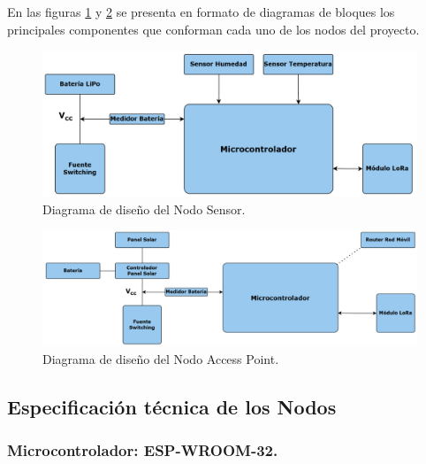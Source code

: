 En las figuras \ref{fig:DisNodoSensor} y \ref{fig:DisNodoAP} se presenta en formato de diagramas de bloques los principales componentes que conforman cada uno de los nodos del proyecto.



\begin{figure}[H]
    \centering
    \includegraphics[width=1\linewidth]{Figures/Hardware/Modulos/nodo_sensor.png}
    \caption{ Diagrama de diseño del Nodo Sensor.}
    \label{fig:DisNodoSensor}
\end{figure}

\begin{figure}[H]
    \centering
    \includegraphics[width=1\linewidth]{Figures/Hardware/Modulos/nodo_ap.png}
    \caption{Diagrama de diseño del Nodo Access Point.}
    \label{fig:DisNodoAP}
\end{figure}


\subsection{Especificación técnica de los Nodos}
\label{sec:DescrModulos}

\subsubsection{Microcontrolador: ESP-WROOM-32.}

